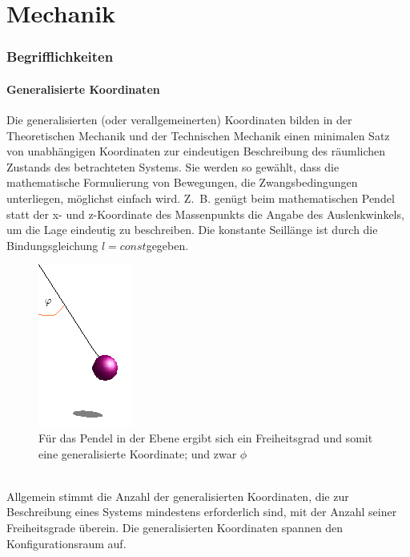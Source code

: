 \part{Mechanik}
\section{Begrifflichkeiten}
	\subsection{Generalisierte Koordinaten}
		Die generalisierten (oder verallgemeinerten) Koordinaten bilden in der Theoretischen Mechanik und der Technischen Mechanik einen minimalen Satz von unabhängigen Koordinaten zur eindeutigen Beschreibung des räumlichen Zustands des betrachteten Systems. Sie werden so gewählt, dass die mathematische Formulierung von Bewegungen, die Zwangsbedingungen unterliegen, möglichst einfach wird. Z. B. genügt beim mathematischen Pendel statt der x- und z-Koordinate des Massenpunkts die Angabe des Auslenkwinkels, um die Lage eindeutig zu beschreiben. Die konstante Seillänge ist durch die Bindungsgleichung 
		$ l = const $gegeben.
		\begin{figure}[h]
			\centering
			\includegraphics[width=0.15\linewidth]{./pics/me/Pendel}
			\caption{Für das Pendel in der Ebene ergibt sich ein Freiheitsgrad und somit eine generalisierte Koordinate; und zwar $ \phi $}
		\end{figure}
		\leavevmode\\
		Allgemein stimmt die Anzahl der generalisierten Koordinaten, die zur Beschreibung eines Systems mindestens erforderlich sind, mit der Anzahl seiner Freiheitsgrade überein. Die generalisierten Koordinaten spannen den Konfigurationsraum auf.
